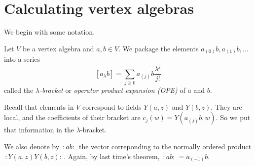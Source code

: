 \section{Calculating vertex algebras}
\label{section-calculating-vertex-algebras}


We begin with some notation.

\begin{definition}
\label{definition-lambda-bracket}
Let $V$ be a vertex algebra and
$a,b \in V$.
We package the elements
$a_{(0)}b,a_{(1)}b,\ldots$
into a series
$$
[a_{\lambda}b]=\sum_{j \geq 0}a_{(j)}b
\frac{\lambda^j}{j!}
$$
called the {\it $\lambda$-bracket} or {\it
operator product expansion (OPE)}
of $a$ and $b$.
\end{definition}

Recall that elements in $V$ correspond to
fields $Y(a,z)$ and $Y(b,z)$.
They are local, and the coefficients of their
bracket are
$c_j(w)=Y(a_{(j)}b,w)$. So we put that
information in the $\lambda$-bracket.

We also denote by $\,:\!ab\!:\,$ the vector
correponding to the normally ordered
product $\,:\!Y(a,z)Y(b,z)\!:\,$. Again, by
last time's theorem,
$\,:\!ab\!:\,=a_{(-1)}b$.

